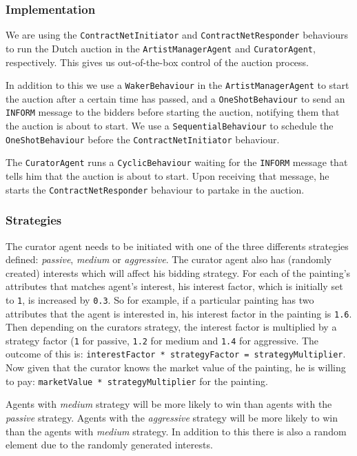 \documentclass[a4paper, 11pt]{article}
\begin{document}
\subsubsection{Implementation}

We are using the \texttt{ContractNetInitiator} and \texttt{ContractNetResponder} behaviours to run the Dutch auction in the \texttt{ArtistManagerAgent} and \texttt{CuratorAgent}, respectively. This gives us out-of-the-box control of the auction process.

In addition to this we use a \texttt{WakerBehaviour} in the \texttt{ArtistManagerAgent} to start the auction after a certain time has passed, and a \texttt{OneShotBehaviour} to send an \texttt{INFORM} message to the bidders before starting the auction, notifying them that the auction is about to start. We use a \texttt{SequentialBehaviour} to schedule the \texttt{OneShotBehaviour} before the \texttt{ContractNetInitiator} behaviour. 

The \texttt{CuratorAgent} runs a \texttt{CyclicBehaviour} waiting for the \texttt{INFORM} message that tells him that the auction is about to start. Upon receiving that message, he starts the \texttt{ContractNetResponder} behaviour to partake in the auction.

\subsubsection{Strategies}

The curator agent needs to be initiated with one of the three differents strategies defined: \textit{passive}, \textit{medium} or \textit{aggressive}. The curator agent also has (randomly created) interests which will affect his bidding strategy. For each of the painting's attributes that matches agent's interest, his interest factor, which is initially set to \texttt{1}, is increased by \texttt{0.3}. So for example, if a particular painting has two attributes that the agent is interested in, his interest factor in the painting is \texttt{1.6}. Then depending on the curators strategy, the interest factor is multiplied by a strategy factor (\texttt{1} for passive, \texttt{1.2} for medium and \texttt{1.4} for aggressive. The outcome of this is: \texttt{interestFactor * strategyFactor = strategyMultiplier}. Now given that the curator knows the market value of the painting, he is willing to pay: \texttt{marketValue * strategyMultiplier} for the painting. 

Agents with \textit{medium} strategy will be more likely to win than agents with the \textit{passive} strategy. Agents with the \textit{aggressive} strategy will be more likely to win than the agents with \textit{medium} strategy. In addition to this there is also a random element due to the randomly generated interests.
\end{document}
